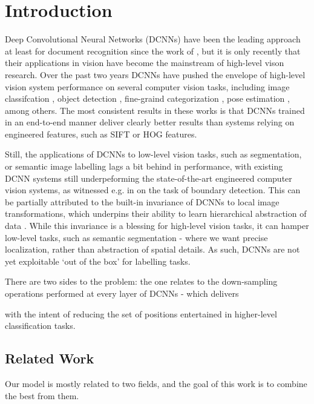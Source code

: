 \section{Introduction}
\label{sec:intro}
 Deep Convolutional Neural Networks (DCNNs) have been the leading approach  at least
for document recognition since the  work of \citet{LeCun1998}, but 
it is only recently that their applications in  vision have become the mainstream of high-level vison research.
Over the past two years  DCNNs have 
 pushed the envelope of high-level vision system performance on several computer vision tasks, including image classifcation \citet{KrizhevskyNIPS2013, papandreou2014untangling, sermanet2013overfeat, simonyan2014very, szegedy2014going}, object detection \citet{girshick2014rcnn}, fine-graind categorization \citet{zhang2014part}, pose estimation \citet{chen2014articulated, tompson2014joint}, among others.
The most consistent results in these works is that DCNNs trained in an end-to-end manner  deliver  clearly better results than systems relying on engineered features, such as SIFT or HOG features.

Still, the applications of DCNNs to low-level vision tasks, such as segmentation, or semantic image labelling  lags a bit behind in performance, with existing DCNN systems still underpeforming the state-of-the-art engineered computer vision systems, as witnessed e.g. in \cite{williams14} on the task of boundary detection. 
 This can be partially attributed to the built-in  invariance of DCNNs to local image transformations, which underpins their ability to learn hierarchical abstraction of data \citep{zeiler2014visualizing}.
While this invariance is a blessing for high-level vision tasks, it can hamper low-level tasks, such as semantic segmentation - where we want precise localization, rather than abstraction of spatial details.  As such, DCNNs are not yet exploitable `out of the box' for labelling tasks. 

There are two sides to the problem: the one relates to the down-sampling operations performed at every layer of DCNNs - which delivers  


 with the intent of reducing the set of positions entertained in higher-level classification tasks. 
\subsection{Related Work}
Our model is mostly related to two fields, and the goal of this work is to combine the best from them.

